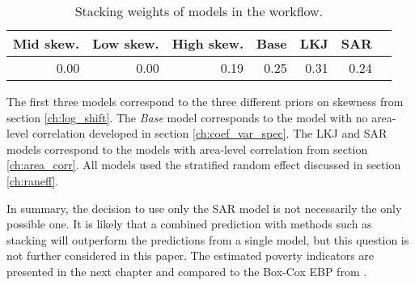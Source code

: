 \begin{table}[ht]
    \caption{Stacking weights of models in the workflow.}
    \begin{center}
        \begin{tabular}{rrrrrrr}
          \hline
         Mid skew. & Low skew. & High skew. & Base & LKJ & SAR \\
          \hline
         0.00 & 0.00 & 0.19 & 0.25 & 0.31 & 0.24 \\
           \hline
        \end{tabular}
    \end{center}

    \begin{adjustwidth}{45pt}{45pt}
        \footnotesize{The first three models correspond to the three different priors on skewness from section \ref{ch:log_shift}. The \textit{Base} model corresponds to the model with no area-level correlation developed in section \ref{ch:coef_var_spec}. The LKJ and SAR models correspond to the models with area-level correlation from section \ref{ch:area_corr}. All models used the stratified random effect discussed in section \ref{ch:raneff}.}
    \end{adjustwidth}
    \label{tab:stacking}
\end{table}

In summary, the decision to use only the SAR model is not necessarily the only possible one.
It is likely that a combined prediction with methods such as stacking will outperform the predictions from a single model, but this question is not further considered in this paper.
The estimated poverty indicators are presented in the next chapter and compared to the Box-Cox EBP from \cite{rojas_perilla_data_2020}.

